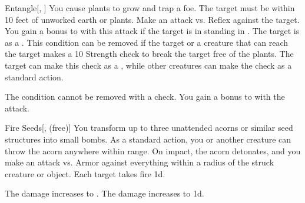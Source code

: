 \lowercase{\hypertarget{spell:Entangle}{}}\label{spell:Entangle}
\begin{freeability}[Rank 3]{\hypertarget{spell:Entangle}{Entangle}}[, ]
You cause plants to grow and trap a foe.
The target must be within 10 feet of unworked earth or plants.
Make an attack vs. Reflex against the target.
You gain a  bonus to  with this attack if the target is in standing in .
\hit The target is  as a .
This condition can be removed if the target or a creature that can reach the target makes a  10 Strength check to break the target free of the plants.
The target can make this check as a , while other creatures can make the check as a standard action.

\rankline
{} The condition cannot be removed with a check.
 You gain a  bonus to  with the attack.
\end{freeability}
\vspace{0.25em}



\lowercase{\hypertarget{spell:Fire Seeds}{}}\label{spell:Fire Seeds}
\begin{freeability}[Rank 3]{\hypertarget{spell:Fire Seeds}{Fire Seeds}}[,  (free)]
You transform up to three unattended acorns or similar seed structures into small bombs.
As a standard action, you or another creature can throw the acorn anywhere within \rngclose range.
On impact, the acorn detonates, and you make an attack vs. Armor against everything within a \areasmall radius of the struck creature or object.
\hit Each target takes fire  \minus1d.

\rankline
{} The damage increases to .
 The damage increases to  \plus1d.
\end{freeability}
\vspace{0.25em}



